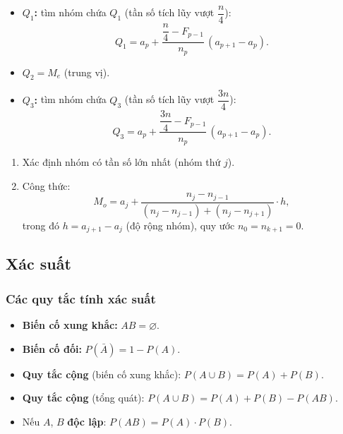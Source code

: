 \documentclass[12pt,a4paper]{article}
\begin{document}
\begin{congthuc}[title={Tứ phân vị}]
  \begin{itemize}
    \item \textbf{$Q_1$:} tìm nhóm chứa $Q_1$ (tần số tích lũy vượt $\dfrac{n}{4}$):
      \[
        Q_1 = a_p + \dfrac{\dfrac{n}{4} - F_{p-1}}{n_p}\,(a_{p+1} - a_p).
      \]
    \item \textbf{$Q_2 = M_e$} (trung vị).
    \item \textbf{$Q_3$:} tìm nhóm chứa $Q_3$ (tần số tích lũy vượt $\dfrac{3n}{4}$):
      \[
        Q_3 = a_p + \dfrac{\dfrac{3n}{4} - F_{p-1}}{n_p}\,(a_{p+1} - a_p).
      \]
  \end{itemize}
\end{congthuc}

\begin{congthuc}[title={Mốt $M_o$}]
  \begin{enumerate}
    \item Xác định nhóm có tần số lớn nhất (nhóm thứ $j$).
    \item Công thức:
      \[
        M_o = a_j + \dfrac{n_j - n_{j-1}}{(n_j - n_{j-1}) + (n_j - n_{j+1})} \cdot h,
      \]
      trong đó $h = a_{j+1} - a_j$ (độ rộng nhóm), quy ước $n_0 = n_{k+1} = 0$.
  \end{enumerate}
\end{congthuc}

\subsection{Xác suất}

\subsubsection{Các quy tắc tính xác suất}

\begin{dinhnghia}
  \begin{itemize}
    \item \textbf{Biến cố xung khắc:} $AB = \varnothing$.
    \item \textbf{Biến cố đối:} $P(\bar{A}) = 1 - P(A)$.
  \end{itemize}
\end{dinhnghia}

\begin{congthuc}
  \begin{itemize}
    \item \textbf{Quy tắc cộng} (biến cố xung khắc):
      \;$P(A \cup B) = P(A) + P(B)$.
    \item \textbf{Quy tắc cộng} (tổng quát):
      \;$P(A \cup B) = P(A) + P(B) - P(AB)$.
    \item Nếu $A$, $B$ \textbf{độc lập}:
      \;$P(AB) = P(A) \cdot P(B)$.
  \end{itemize}
\end{congthuc}
\end{document}

